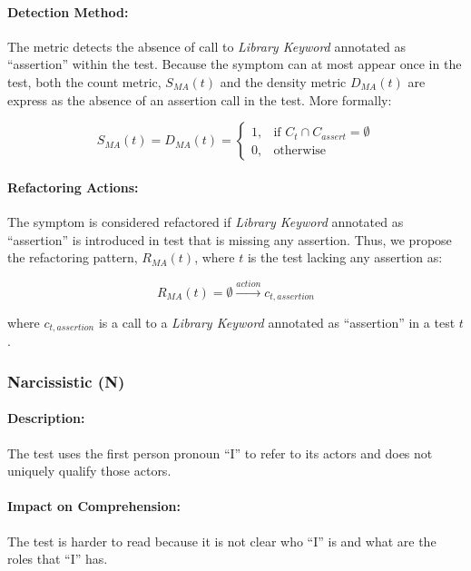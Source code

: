 \paragraph{Detection Method:}

The metric detects the absence of call to \emph{Library Keyword} annotated as ``assertion'' within the test. Because the symptom can at most appear once in the test, both the count metric, $S_{MA}(t)$ and the density metric $D_{MA}(t)$ are express as the absence of an assertion call in the test. More formally:

\begin{equation*}
    S_{MA}(t) = D_{MA}(t) = 
    \begin{cases}
        1,   & \text{if } C_{t} \cap C_{assert} = \emptyset\\
        0,   & \text{otherwise}
    \end{cases}
\end{equation*}

\paragraph{Refactoring Actions:}

The symptom is considered refactored if \emph{Library Keyword} annotated as ``assertion'' is introduced in test that is missing any assertion. Thus, we propose the refactoring pattern, $R_{MA}(t)$, where $t$ is the test lacking any assertion as:

\begin{equation*}
    R_{MA}(t) = \emptyset \xrightarrow{action} c_{t, assertion}
\end{equation*}

where $c_{t, assertion}$ is a call to a \emph{Library Keyword} annotated as ``assertion'' in a test $t$.

\subsubsection{Narcissistic (N)}

\paragraph{Description:}

The test uses the first person pronoun ``I'' to refer to its actors and does not uniquely qualify those actors.

\paragraph{Impact on Comprehension:} The test is harder to read because it is not clear who ``I'' is and what are the roles that ``I'' has.

